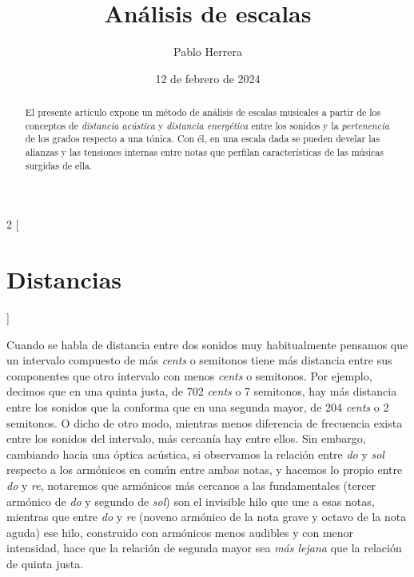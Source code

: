 \documentclass[a4paper,11pt]{article}
\begin{document}
\title{Análisis de escalas}
\author{Pablo Herrera}
\date{12 de febrero de 2024}
\maketitle
\begin{abstract}
El presente artículo expone un método de análisis de escalas musicales a partir de los conceptos de \emph{distancia acústica} y \emph{distancia energética} entre los sonidos y la \emph{pertenencia} de los grados respecto a una tónica. Con él, en una escala dada se pueden develar las alianzas y las tensiones internas entre notas que perfilan características de las músicas surgidas de ella.
\end{abstract}
\tableofcontents
\newpage
\begin{multicols}{2}
[\section{Distancias}\label{sec:distancias}]

  Cuando se habla de distancia entre dos sonidos muy habitualmente pensamos que un intervalo compuesto de más \emph{cents} o semitonos tiene más distancia entre sus componentes que otro intervalo con menos \emph{cents} o semitonos. Por ejemplo, decimos que en una quinta justa, de 702 \emph{cents} o 7 semitonos, hay más distancia entre los sonidos que la conforma que en una segunda mayor, de 204 \emph{cents} o 2 semitonos. O dicho de otro modo, mientras menos diferencia de frecuencia exista entre los sonidos del intervalo, más cercanía hay entre ellos. Sin embargo, cambiando hacia una óptica acústica, si observamos la relación entre \emph{do} y \emph{sol} respecto a los armónicos en común entre ambas notas, y hacemos lo propio entre \emph{do} y \emph{re}, notaremos que armónicos más cercanos a las fundamentales (tercer armónico de \emph{do} y segundo de \emph{sol}) son el invisible hilo que une a esas notas, mientras que entre \emph{do} y \emph{re} (noveno armónico de la nota grave y octavo de la nota aguda) ese hilo, construido con armónicos menos audibles y con menor intensidad, hace que la relación de segunda mayor sea \emph{más lejana} que la relación de quinta justa.


\end{multicols}
\end{document}

